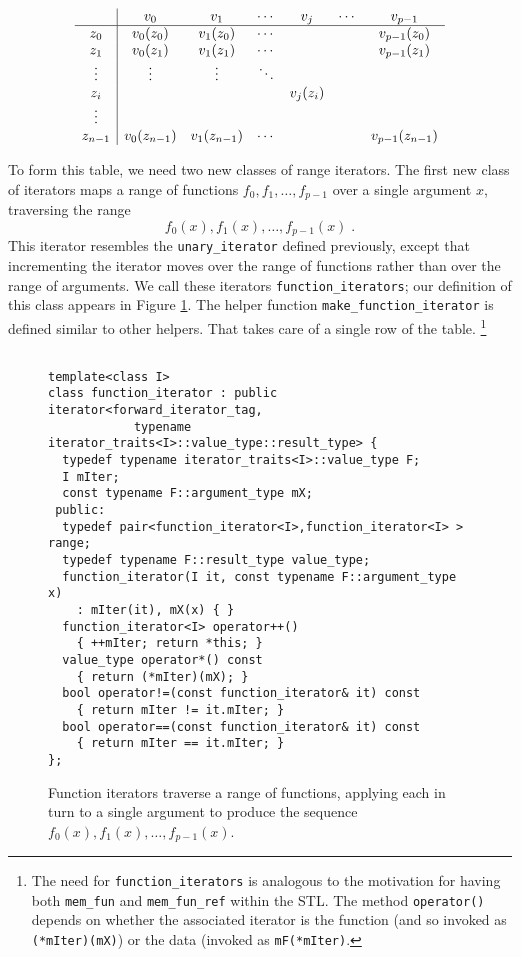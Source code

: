 \documentclass[12pt]{article}
\begin{document}
\begin{displaymath}
  \begin{array}{c|cccccc}
       & v_0         & v_1         & \cdots   & v_j      & \cdots & v_{p-1} \cr \hline
z_0    & v_0(z_0)    & v_1(z_0)    & \cdots   &          &        & v_{p-1}(z_0)  \cr
z_1    & v_0(z_1)    & v_1(z_1)    & \cdots   &          &        & v_{p-1}(z_1)  \cr
\vdots & \vdots      & \vdots      & \ddots   &          &        &         \cr
z_i    &             &             &          & v_j(z_i) &        &         \cr
\vdots &             &             &          &          &        &         \cr
z_{n-1}& v_0(z_{n-1})& v_1(z_{n-1})& \cdots   &          &        & v_{p-1}(z_{n-1}) \cr
\end{array}
\end{displaymath}



  To form this table, we need two new classes of range iterators.  The
first new class of iterators maps a range of functions $f_0,
f_1,\ldots,f_{p-1}$ over a single argument $x$, traversing the range
\begin{displaymath}
  f_0(x), f_1(x), \ldots , f_{p-1}(x)    \;.
\end{displaymath}
This iterator resembles the {\tt unary\_iterator} defined previously,
except that incrementing the iterator moves over the range of
functions rather than over the range of arguments.  We call these
iterators {\tt function\_iterators}; our definition of this class
appears in Figure \ref{figure:function iterators}.  The helper
function {\tt make\_function\_iterator} is defined similar to other
helpers.  That takes care of a single row of the table. \footnote{The
need for {\tt function\_iterators} is analogous to the motivation for
having both {\tt mem\_fun} and {\tt mem\_fun\_ref} within the STL. The
method {\tt operator()} depends on whether the associated iterator is
the function (and so invoked as {\tt (*mIter)(mX)}) or the data
(invoked as {\tt mF(*mIter)}. }

\begin{figure}
\label{figure:function iterators}
\caption{Function iterators traverse a range of functions, applying
each in turn to a single argument to produce the sequence $f_0(x),
f_1(x), \ldots, f_{p-1}(x)$.}
\begin{verbatim}

template<class I>
class function_iterator : public iterator<forward_iterator_tag, 
            typename iterator_traits<I>::value_type::result_type> {
  typedef typename iterator_traits<I>::value_type F;
  I mIter;
  const typename F::argument_type mX;  
 public:
  typedef pair<function_iterator<I>,function_iterator<I> > range;
  typedef typename F::result_type value_type;
  function_iterator(I it, const typename F::argument_type x)
    : mIter(it), mX(x) { }
  function_iterator<I> operator++() 
    { ++mIter; return *this; }
  value_type operator*() const
    { return (*mIter)(mX); }
  bool operator!=(const function_iterator& it) const
    { return mIter != it.mIter; }
  bool operator==(const function_iterator& it) const
    { return mIter == it.mIter; }
};
\end{verbatim}
\end{figure}
\end{document}
